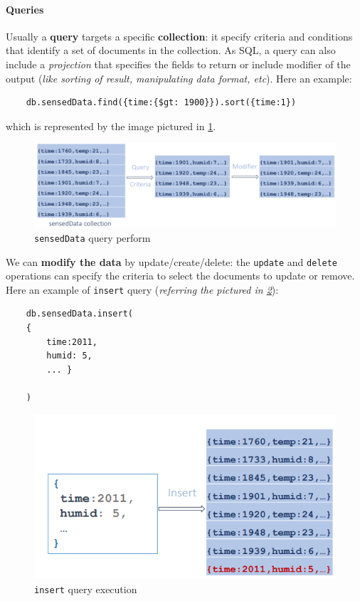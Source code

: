 \documentclass[10pt,a4paper]{report}
\theoremstyle{definition}
\begin{document}
\paragraph{Queries}\label{sec:queries}
Usually a \textbf{query} targets a specific \textbf{collection}: it specify criteria and conditions that identify a set of documents in the collection. As SQL, a query can also include a \textit{projection} that specifies the fields to return or include modifier of the output (\textit{like sorting of result, manipulating data format, etc}).  Here an example:
\begin{verbatim}
	db.sensedData.find({time:{$gt: 1900}}).sort({time:1})
\end{verbatim}

which is represented by the image pictured in \ref{query-example}.
\begin{figure}[h]
	\centering
	\includegraphics[scale=0.50]{images/Pasted image 20230221160450.png}
	\caption{\texttt{sensedData} query perform}
	\label{query-example}\end{figure}


We can \textbf{modify the data} by update/create/delete: the \texttt{update} and \texttt{delete} operations can specify the criteria to select the documents to update or remove. Here an example of \texttt{insert} query (\textit{referring the pictured in \ref{query-example2}}):
\begin{verbatim}
	db.sensedData.insert( 
	{ 
		time:2011, 
		humid: 5, 
		... } 
	
	)
\end{verbatim}

\begin{figure}[h]
	\centering
	\includegraphics[scale=0.50]{images/Pasted image 20230221160655.png}
	\caption{\texttt{insert} query execution}\label{query-example2}\end{figure}
\end{document}
